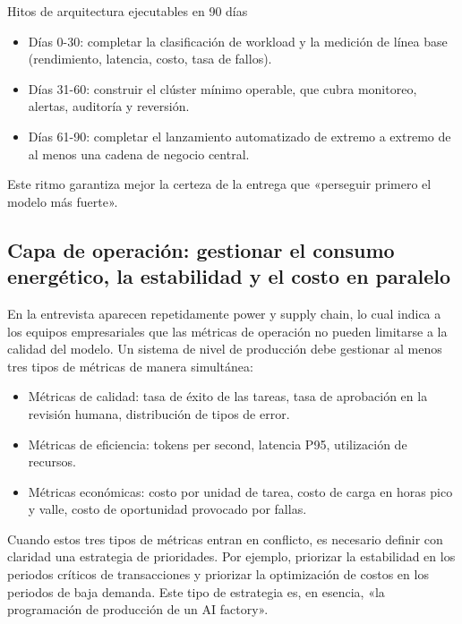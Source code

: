 \documentclass[a4paper]{article}
\begin{document}
\begin{importantbox}{Hitos de arquitectura ejecutables en 90 días}
\begin{itemize}
    \item Días 0-30: completar la clasificación de workload y la medición de línea base (rendimiento, latencia, costo, tasa de fallos).
    \item Días 31-60: construir el clúster mínimo operable, que cubra monitoreo, alertas, auditoría y reversión.
    \item Días 61-90: completar el lanzamiento automatizado de extremo a extremo de al menos una cadena de negocio central.
\end{itemize}
Este ritmo garantiza mejor la certeza de la entrega que «perseguir primero el modelo más fuerte».
\end{importantbox}

\subsection{Capa de operación: gestionar el consumo energético, la estabilidad y el costo en paralelo}

En la entrevista aparecen repetidamente power y supply chain, lo cual indica a los equipos empresariales que las métricas de operación no pueden limitarse a la calidad del modelo. Un sistema de nivel de producción debe gestionar al menos tres tipos de métricas de manera simultánea:
\begin{itemize}
    \item Métricas de calidad: tasa de éxito de las tareas, tasa de aprobación en la revisión humana, distribución de tipos de error.
    \item Métricas de eficiencia: tokens per second, latencia P95, utilización de recursos.
    \item Métricas económicas: costo por unidad de tarea, costo de carga en horas pico y valle, costo de oportunidad provocado por fallas.
\end{itemize}

Cuando estos tres tipos de métricas entran en conflicto, es necesario definir con claridad una estrategia de prioridades. Por ejemplo, priorizar la estabilidad en los periodos críticos de transacciones y priorizar la optimización de costos en los periodos de baja demanda. Este tipo de estrategia es, en esencia, «la programación de producción de un AI factory».
\end{document}
